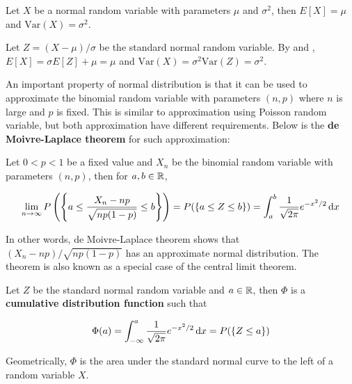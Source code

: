 \documentclass[a4paper,12pt]{article}
\begin{document}
\begin{thm}
  Let $X$ be a normal random variable with parameters $\mu$ and $\sigma^{2}$, then $E[X]=\mu$ and $\mathrm{Var}(X)=\sigma^{2}$.\n

  \prf Let $Z=(X-\mu)/\sigma$ be the standard normal random variable. By \rpst[\sctr{2}] and \rpst[\sctr{1}], $E[X]=\sigma E[Z]+\mu=\mu$ and $\mathrm{Var}(X)=\sigma^{2}\mathrm{Var}(Z)=\sigma^{2}$.
\end{thm}\n

An important property of normal distribution is that it can be used to approximate the binomial random variable with parameters $(n,p)$ where $n$ is large and $p$ is fixed. This is similar to approximation using Poisson random variable, but both approximation have different requirements. Below is the \textbf{de Moivre-Laplace theorem} for such approximation:\n

\begin{thm}
  Let $0<p<1$ be a fixed value and $X_{n}$ be the binomial random variable with parameters $(n,p)$, then for $a,b\in\mathbb{R}$,

  $$\lim_{n\to\infty}P\left( \left\{ a\leq\frac{X_{n}-np}{\sqrt{np(1-p)}}\leq b\right\}\right)=P(\left\{ a\leq Z\leq b\right\})=\int_{a}^{b}\frac{1}{\sqrt{2\pi}}e^{-x^{2}/2}\,\mathrm{d} x$$
\end{thm}\n

In other words, de Moivre-Laplace theorem shows that $(X_{n}-np)/\sqrt{np(1-p)}$ has an approximate normal distribution. The theorem is also known as a special case of the central limit theorem.\n

\begin{dft}
  Let $Z$ be the standard normal random variable and $a\in\mathbb{R}$, then $\Phi$ is a \textbf{cumulative distribution function} such that

  $$\Phi(a)=\int_{-\infty}^{a}\frac{1}{\sqrt{2\pi}}e^{-x^{2}/2}\,\mathrm{d} x=P(\left\{ Z\leq a\right\})$$
\end{dft}\n

Geometrically, $\Phi$ is the area under the standard normal curve to the left of a random variable $X$.
\end{document}
